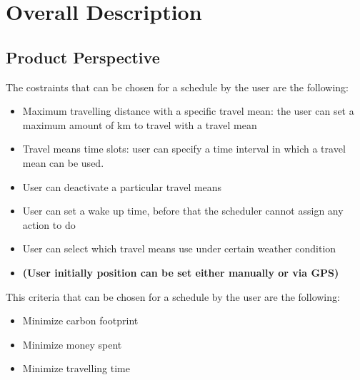 \chapter{Overall Description}

\section{Product Perspective}

The costraints that can be chosen for a schedule by the user are the following:
\begin{itemize}
\item Maximum travelling distance with a specific travel mean: the user can set a maximum amount of km to travel with a travel mean
\item Travel means time slots: user can specify a time interval in which a travel mean can be used.
\item User can deactivate a particular travel means
\item User can set a wake up time, before that the scheduler cannot assign any action to do
\item User can select which travel means use under certain weather condition
\item \textbf{(User initially position can be set either manually or via GPS)}
\end{itemize}

This criteria that can be chosen for a schedule by the user are the following:
\begin{itemize}
\item Minimize carbon footprint
\item Minimize money spent
\item Minimize travelling time
\end{itemize}